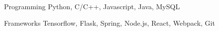 

\begin{cvskills}


\cvskill
{Programming} %
{Python, C/C++, Javascript, Java, MySQL} %

\cvskill
  {Frameworks} %
  {Tensorflow, Flask, Spring, Node.js, React, Webpack, Git} %
  

\end{cvskills}
